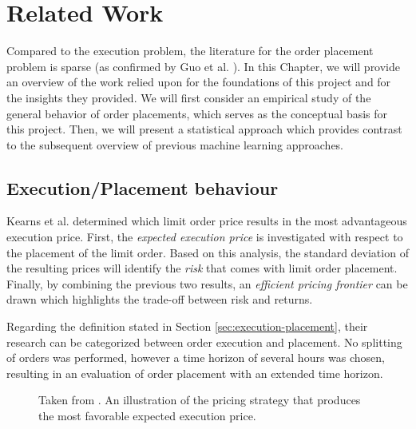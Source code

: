 \chapter{Related Work}
\label{chap:related-work}

Compared to the execution problem, the literature for the order placement problem is sparse (as confirmed by Guo et al. \cite{guo2013optimal}).
In this Chapter, we will provide an overview of the work relied upon for the foundations of this project and for the insights they provided.
We will first consider an empirical study of the general behavior of order placements, which serves as the conceptual basis for this project.
Then, we will present a statistical approach which provides contrast to the subsequent overview of previous machine learning approaches.

\section{Execution/Placement behaviour}
\label{sec:related-execution-behaviour}

Kearns et al. \cite{nevmyvaka2005electronic} determined which limit order price results in the most advantageous execution price.
First, the \textit{expected execution price} is investigated with respect to the placement of the limit order. 
Based on this analysis, the standard deviation of the resulting prices will identify the \textit{risk} that comes with limit order placement. 
Finally, by combining the previous two results, an \textit{efficient pricing frontier} can be drawn which highlights the trade-off between risk and returns.

Regarding the definition stated in Section \ref{sec:execution-placement}, their research can be categorized between order execution and placement.
No splitting of orders was performed, however a time horizon of several hours was chosen, resulting in an evaluation of order placement with an extended time horizon.

\begin{figure}[H]
    \centering
    \caption{Taken from \cite{nevmyvaka2005electronic}. An illustration of the pricing strategy that produces the most favorable expected execution price.}
    \label{fig:kearns-return}
\end{figure}

